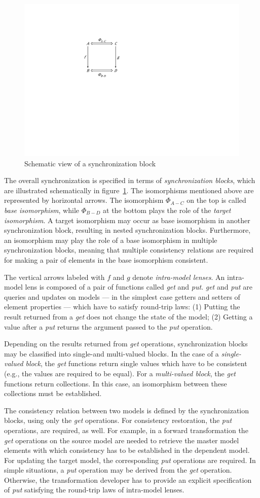 \begin{figure}[tb!]
	\centering
	\includegraphics[width=0.35\columnwidth]{diagrams/solutions/NMFSynchronizationBlock}
	\caption{Schematic view of a synchronization block}
	\label{fig:SynchronizationBlock}
\end{figure}

The overall synchronization is specified in terms of \emph{synchronization blocks}, which are illustrated schematically in figure~\ref{fig:SynchronizationBlock}. The isomorphisms mentioned above are represented by horizontal arrows. The isomorphism $\varPhi_{A-C}$ on the top is called \emph{base isomorphism}, while $\varPhi_{B-D}$ at the bottom plays the role of the \emph{target isomorphism}. A target isomorphism may occur as base isomorphism in another synchronization block, resulting in nested synchronization blocks. Furthermore, an isomorphism may play the role of a base isomorphism in multiple synchronization blocks, meaning that multiple consistency relations are required for making a pair of elements in the base isomorphism consistent.

The vertical arrows labeled with $f$ and $g$ denote \emph{intra-model lenses}. An intra-model lens is composed of a pair of functions called \emph{get} and \emph{put}. \emph{get} and \emph{put} are queries and updates on models --- in the simplest case getters and setters of element properties --- which have to satisfy round-trip laws: (1) Putting the result returned from a \emph{get} does not change the state of the model; (2) Getting a value after a \emph{put} returns the argument passed to the \emph{put} operation.

Depending on the results returned from \emph{get} operations, synchronization blocks may be classified into single-and multi-valued blocks. In the case of a \emph{single-valued block}, the \emph{get} functions return single values which have to be consistent (e.g., the values are required to be equal). For a \emph{multi-valued block}, the \emph{get} functions return collections. In this case, an isomorphism between these collections must be established.

The consistency relation between two models is defined by the synchronization blocks, using only the \emph{get} operations. For consistency restoration, the \emph{put} operations, are required, as well. For example, in a forward transformation the \emph{get} operations on the source model are needed to retrieve the master model elements with which consistency has to be established in the dependent model. For updating the target model, the corresponding \emph{put} operations are required. In simple situations, a \emph{put} operation may be derived from the \emph{get} operation. Otherwise, the transformation developer has to provide an explicit specification of \emph{put} satisfying the round-trip laws of intra-model lenses. 

